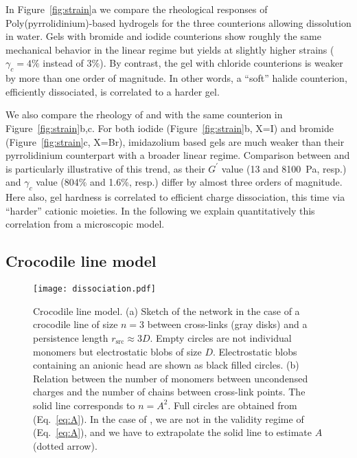 \documentclass[journal=jacsat,manuscript=article]{achemso}
\begin{document}
In Figure~\ref{fig:strain}a we compare the rheological responses of Poly(pyrrolidinium)-based hydrogels for the three counterions allowing dissolution in water. Gels with bromide and iodide counterions show roughly the same mechanical behavior in the linear regime but  yields at slightly higher strains ($\gamma_c=4\%$ instead of $3\%$). By contrast, the gel with chloride counterions is weaker by more than one order of magnitude. In other words, a ``soft'' halide counterion, efficiently dissociated, is correlated to a harder gel.

We also compare the rheology of  and  with the same counterion  in Figure~\ref{fig:strain}b,c. For both iodide (Figure~\ref{fig:strain}b, X=I) and bromide (Figure~\ref{fig:strain}c, X=Br), imidazolium based gels are much weaker than their pyrrolidinium counterpart with a broader linear regime. Comparison between  and  is particularly illustrative of this trend, as their $G^\prime$ value (13 and \SI{8100}{\pascal}, resp.) and $\gamma_c$ value (804\% and 1.6\%, resp.) differ by almost three orders of magnitude. Here also, gel hardness is correlated to efficient charge dissociation, this time via ``harder'' cationic moieties. In the following we explain quantitatively this correlation from a microscopic model.



\subsection{Crocodile line model}

\begin{figure}
\texttt{[image: dissociation.pdf]}
\caption{Crocodile line model. (a) Sketch of the network in the case of a crocodile line of size $n=3$ between cross-links (gray disks) and a persistence length $r_\mathrm{src}\approx 3D$. Empty circles are not individual monomers but electrostatic blobs of size $D$. Electrostatic blobs containing an anionic head are shown as black filled circles. (b) Relation between the number of monomers between uncondensed charges and the number of chains between cross-link points. The solid line corresponds to $n = A^2$. Full circles are obtained from (Eq.~\ref{eq:A}). In the case of , we are not in the validity regime of (Eq.~\ref{eq:A}), and we have to extrapolate the solid line to estimate $A$ (dotted arrow).}
\label{fig:dissociation}
\end{figure}
\end{document}
